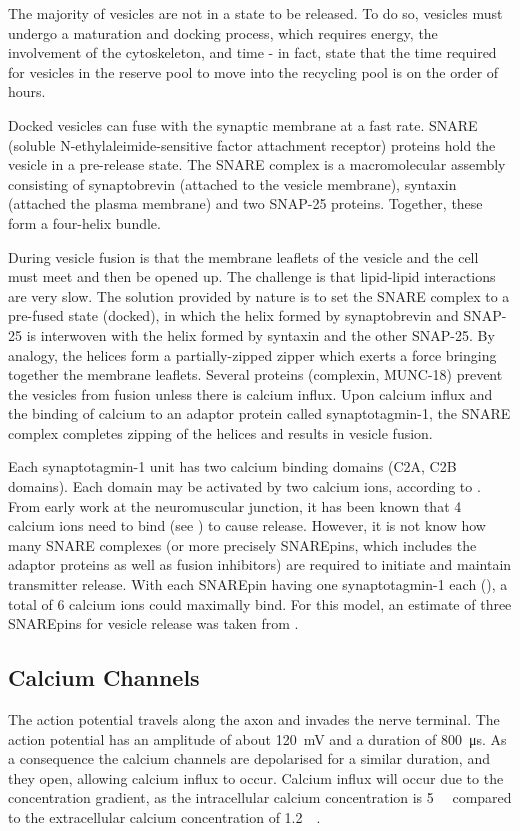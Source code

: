 \documentclass[a4paper]{article}
\begin{document}
The majority of vesicles are not in a state to be released. To do so, vesicles must undergo a maturation and docking process, which requires energy, the involvement of the cytoskeleton, and time - in fact, \cite{rizzoli2005synaptic} state that the time required for vesicles in the reserve pool to move into the recycling pool is on the order of hours.

Docked vesicles can fuse with the synaptic membrane at a fast rate. SNARE (soluble N-ethylaleimide-sensitive factor attachment receptor) proteins hold the vesicle in a pre-release state. The SNARE complex is a macromolecular assembly consisting of synaptobrevin (attached to the vesicle membrane), syntaxin (attached the plasma membrane) and two SNAP-25 proteins. Together, these form a four-helix bundle.

During vesicle fusion is that the membrane leaflets of the vesicle and the cell must meet and then be opened up. The challenge is that lipid-lipid interactions are very slow. The solution provided by nature is to set the SNARE complex to a pre-fused state (docked), in which the helix formed by synaptobrevin and SNAP-25 is interwoven with the helix formed by syntaxin and the other SNAP-25. By analogy, the helices form a partially-zipped zipper which exerts a force bringing together the membrane leaflets. Several proteins (complexin, MUNC-18) prevent the vesicles from fusion unless there is calcium influx. Upon calcium influx and the binding of calcium to an adaptor protein called synaptotagmin-1, the SNARE complex completes zipping of the helices and results in vesicle fusion.

Each synaptotagmin-1 unit has two calcium binding domains (C2A, C2B domains). Each domain may be activated by two calcium ions, according to \cite{Shao:Science:1996}. From early work at the neuromuscular junction, it has been known that 4 calcium ions need to bind (see \cite{Dodge:JPhysiol:1967}) to cause release. However, it is not know how many SNARE complexes (or more precisely SNAREpins, which includes the adaptor proteins as well as fusion inhibitors) are required to initiate and maintain transmitter release. With each SNAREpin having one synaptotagmin-1 each (\cite{Wilhelm:Science:2014}), a total of 6 calcium ions could maximally bind. For this model, an estimate of three SNAREpins for vesicle release was taken from \cite{Dittrich:BiophysJ:2013}.

\subsection{Calcium Channels}
The action potential travels along the axon and invades the nerve terminal. The action potential has an amplitude of about \SI{120}{\milli\volt} and a duration of \SI{800}{\micro\second}. As a consequence the calcium channels are depolarised for a similar duration, and they open, allowing calcium influx to occur. Calcium influx will occur due to the concentration gradient, as the intracellular calcium concentration is \SI{5}{\nano\molar} compared to the extracellular calcium concentration of \SI{1.2}{\milli\molar}.
\end{document}
